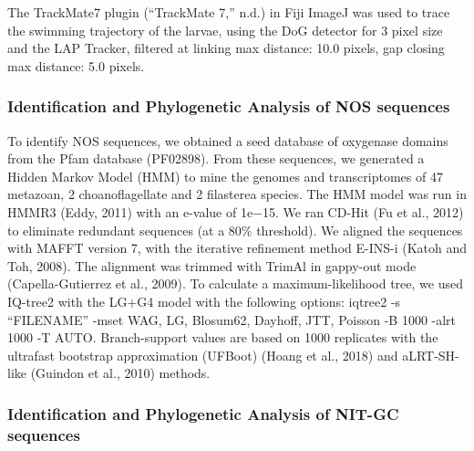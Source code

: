 \documentclass[
  11pt,
  letterpaper,
  DIV=11,
  numbers=noendperiod]{scrartcl}
\begin{document}
The TrackMate7 plugin ({``TrackMate 7,''} n.d.) in Fiji ImageJ was used
to trace the swimming trajectory of the larvae, using the DoG detector
for 3 pixel size and the LAP Tracker, filtered at linking max distance:
10.0 pixels, gap closing max distance: 5.0 pixels.

\subsubsection{Identification and Phylogenetic Analysis of NOS
sequences}\label{identification-and-phylogenetic-analysis-of-nos-sequences}

To identify NOS sequences, we obtained a seed database of oxygenase
domains from the Pfam database (PF02898). From these sequences, we
generated a Hidden Markov Model (HMM) to mine the genomes and
transcriptomes of 47 metazoan, 2 choanoflagellate and 2 filasterea
species. The HMM model was run in HMMR3 (Eddy, 2011) with an e-value of
1e−15. We ran CD-Hit (Fu et al., 2012) to eliminate redundant sequences
(at a 80\% threshold). We aligned the sequences with MAFFT version 7,
with the iterative refinement method E-INS-i (Katoh and Toh, 2008). The
alignment was trimmed with TrimAl in gappy-out mode (Capella-Gutierrez
et al., 2009). To calculate a maximum-likelihood tree, we used IQ-tree2
with the LG+G4 model with the following options: iqtree2 -s ``FILENAME''
-mset WAG, LG, Blosum62, Dayhoff, JTT, Poisson -B 1000 -alrt 1000 -T
AUTO. Branch-support values are based on 1000 replicates with the
ultrafast bootstrap approximation (UFBoot) (Hoang et al., 2018) and
aLRT-SH-like (Guindon et al., 2010) methods.

\subsubsection{Identification and Phylogenetic Analysis of NIT-GC
sequences}\label{identification-and-phylogenetic-analysis-of-nit-gc-sequences}
\end{document}
